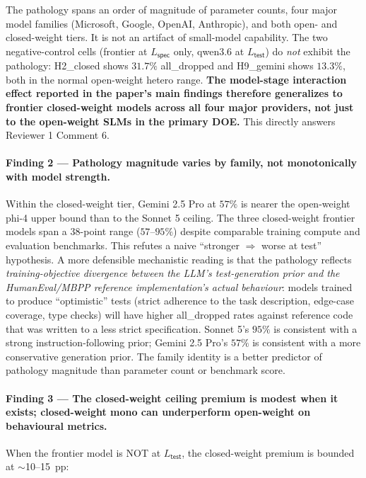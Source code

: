 The pathology spans an order of magnitude of parameter counts, four major model families (Microsoft, Google, OpenAI, Anthropic), and both open- and closed-weight tiers. It is not an artifact of small-model capability. The two negative-control cells (frontier at $L_{\textsf{spec}}$ only, qwen3.6 at $L_{\textsf{test}}$) do \emph{not} exhibit the pathology: H2\_closed shows $31.7\%$ \textsf{all\_dropped} and H9\_gemini shows $13.3\%$, both in the normal open-weight hetero range. \textbf{The model-stage interaction effect reported in the paper's main findings therefore generalizes to frontier closed-weight models across all four major providers, not just to the open-weight SLMs in the primary DOE.} This directly answers Reviewer 1 Comment 6.

\paragraph{Finding 2 --- Pathology magnitude varies by family, not monotonically with model strength.}
Within the closed-weight tier, Gemini 2.5 Pro at $57\%$ is nearer the open-weight phi-4 upper bound than to the Sonnet 5 ceiling. The three closed-weight frontier models span a $38$-point range ($57$--$95\%$) despite comparable training compute and evaluation benchmarks. This refutes a naive ``stronger $\Rightarrow$ worse at test'' hypothesis. A more defensible mechanistic reading is that the pathology reflects \emph{training-objective divergence between the LLM's test-generation prior and the HumanEval/MBPP reference implementation's actual behaviour}: models trained to produce ``optimistic'' tests (strict adherence to the task description, edge-case coverage, type checks) will have higher \textsf{all\_dropped} rates against reference code that was written to a less strict specification. Sonnet 5's $95\%$ is consistent with a strong instruction-following prior; Gemini 2.5 Pro's $57\%$ is consistent with a more conservative generation prior. The family identity is a better predictor of pathology magnitude than parameter count or benchmark score.

\paragraph{Finding 3 --- The closed-weight ceiling premium is modest when it exists; closed-weight mono can underperform open-weight on behavioural metrics.}
When the frontier model is NOT at $L_{\textsf{test}}$, the closed-weight premium is bounded at $\sim$10--15~pp:

